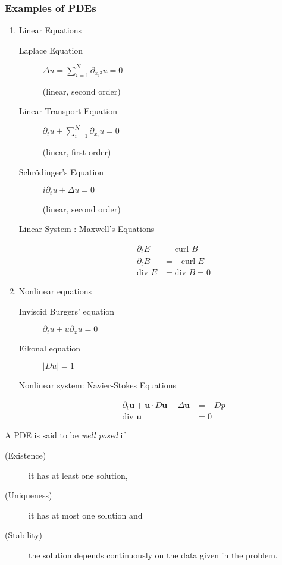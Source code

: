 \subsubsection{Examples of PDEs}
\begin{enumerate}
    \item Linear Equations
	\begin{description}
	    \item[Laplace Equation] $\Delta u = \sum_{i=1}^{N} \partial _{{x_i}^{2}} u =0$ \begin{flushright}(linear, second order)\end{flushright}
	    \item [Linear Transport Equation] $\partial_t u + \sum_{i=1}^{N} \partial_{x_i} u =0$ \begin{flushright}(linear, first order)\end{flushright}
	    \item [Schrödinger's Equation] $i \partial_{t} u + \Delta u =0$ \begin{flushright}(linear, second order)\end{flushright}
	    \item [Linear System : Maxwell's Equations]
		\begin{align*}
		    \partial_t E &=\text{curl } B \\
		    \partial_t B &= - \text{curl } E \\
		    \text{div } E &= \text{div } B =0
		\end{align*}
	\end{description}

    \item Nonlinear equations
	\begin{description}
	    \item[Inviscid Burgers' equation] $\partial_{t} u + u \partial _x u = 0$
	    \item [Eikonal equation] $|Du| = 1$
	    \item [Nonlinear system: Navier-Stokes Equations] \begin{align*}\partial _t \mathbf{u} + \mathbf{u} \cdot D\mathbf{u} - \Delta \mathbf{u} &= -Dp  \\ \text{div } \mathbf{u} &=0\end{align*}
	\end{description}
\end{enumerate}

\begin{definition}
    A PDE is said to be \textit{well posed} if
    \begin{description}
	\item[(Existence)] it has at least one solution,
	\item[(Uniqueness)] it has at most one solution and
	\item[(Stability)] the solution depends continuously on the data given in the problem.
    \end{description}
    \label{def:well-posed}
\end{definition}

